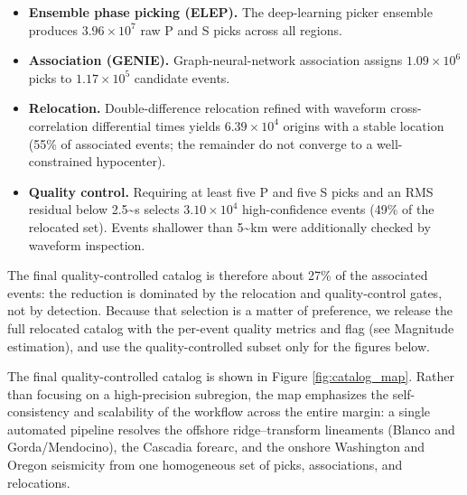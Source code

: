 \documentclass[review]{seismica}
\providecommand{\tightlist}{\setlength{\itemsep}{0pt}\setlength{\parskip}{0pt}}
\begin{document}
\begin{itemize}
\tightlist
\item
  \textbf{Ensemble phase picking (ELEP).} The deep-learning picker
  ensemble produces \(3.96\times10^{7}\) raw P and S picks across all
  regions.
\item
  \textbf{Association (GENIE).} Graph-neural-network association assigns
  \(1.09\times10^{6}\) picks to \(1.17\times10^{5}\) candidate events.
\item
  \textbf{Relocation.} Double-difference relocation refined with
  waveform cross-correlation differential times yields
  \(6.39\times10^{4}\) origins with a stable location (55\% of
  associated events; the remainder do not converge to a well-constrained
  hypocenter).
\item
  \textbf{Quality control.} Requiring at least five P and five S picks
  and an RMS residual below 2.5\textasciitilde s selects
  \(3.10\times10^{4}\) high-confidence events (49\% of the relocated
  set). Events shallower than 5\textasciitilde km were additionally
  checked by waveform inspection.
\end{itemize}

The final quality-controlled catalog is therefore about 27\% of the
associated events: the reduction is dominated by the relocation and
quality-control gates, not by detection. Because that selection is a
matter of preference, we release the full relocated catalog with the
per-event quality metrics and flag (see Magnitude estimation), and use
the quality-controlled subset only for the figures below.

The final quality-controlled catalog is shown in Figure
\ref{fig:catalog_map}. Rather than focusing on a high-precision
subregion, the map emphasizes the self-consistency and scalability of
the workflow across the entire margin: a single automated pipeline
resolves the offshore ridge--transform lineaments (Blanco and
Gorda/Mendocino), the Cascadia forearc, and the onshore Washington and
Oregon seismicity from one homogeneous set of picks, associations, and
relocations.
\end{document}
